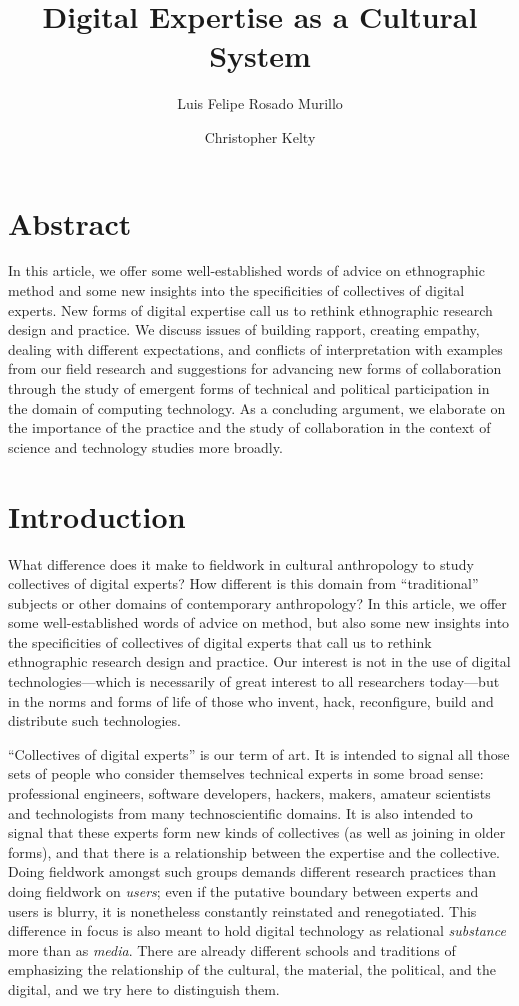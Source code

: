 \documentclass[10pt,letter,oneside]{scrartcl}
\author[1]{Luis Felipe Rosado Murillo}
\author[2]{Christopher Kelty}
\affil[1]{Berkman Center for Internet and Society, Harvard}
\affil[2]{Institute for Society and Genetics, Department of Anthropology, and Department of Information Studies, UCLA}
\title{Digital Expertise as a Cultural System}
\date{}
\begin{document}
\maketitle
\section{Abstract}
In this article, we offer some well-established words of advice on
ethnographic method and some new insights into the specificities of
collectives of digital experts. New forms of digital expertise call us
to rethink ethnographic research design and practice. We discuss
issues of building rapport, creating empathy, dealing with different
expectations, and conflicts of interpretation with examples from our
field research and suggestions for advancing new forms of
collaboration through the study of emergent forms of technical and
political participation in the domain of computing technology.  As a
concluding argument, we elaborate on the importance of the practice
and the study of collaboration in the context of science and
technology studies more broadly.

\doublespacing
\section{Introduction}

What difference does it make to fieldwork in cultural anthropology to
study collectives of digital experts?  How different is this domain
from ``traditional'' subjects or other domains of contemporary
anthropology?  In this article, we offer some well-established words
of advice on method, but also some new insights into the specificities
of collectives of digital experts that call us to rethink ethnographic
research design and practice.  Our interest is not in the use of
digital technologies---which is necessarily of great interest to all
researchers today---but in the norms and forms of life of those who
invent, hack, reconfigure, build and distribute such technologies. 

``Collectives of digital experts'' is our term of art.  It is intended
to signal all those sets of people who consider themselves technical
experts in some broad sense: professional engineers, software
developers, hackers, makers, amateur scientists and technologists from
many technoscientific domains.  It is also intended to signal that
these experts form new kinds of collectives (as well as joining in
older forms), and that there is a relationship between the expertise
and the collective.  Doing fieldwork amongst such groups demands
different research practices than doing fieldwork on \emph{users};
even if the putative boundary between experts and users is blurry, it
is nonetheless constantly reinstated and renegotiated.  This
difference in focus is also meant to hold digital technology as
relational \emph{substance} more than as \emph{media}.  There are
already different schools and traditions of emphasizing the
relationship of the cultural, the material, the political, and the
digital, and we try here to distinguish them.
\end{document}
